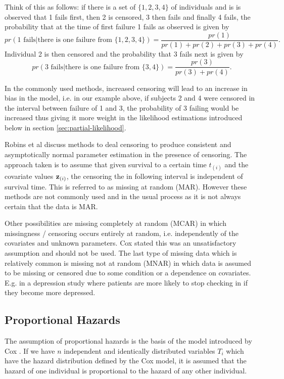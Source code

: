 Think of this as follows: if there is a set of $\{1,2,3,4\}$ of individuals and is is observed that 1 fails first, then 2 is censored, 3 then fails and finally 4 fails, the probability that at the time of first failure 1 fails as observed is given by $$pr(1\textrm{ fails}|\textrm{there is one failure from }\{1,2,3,4\})=\frac{pr(1)}{pr(1)+pr(2)+pr(3)+pr(4)}.$$ Individual 2 is then censored and the probability that 3 fails next is given by $$pr(3\textrm{ fails}|\textrm{there is one failure from }\{3,4\})=\frac{pr(3)}{pr(3)+pr(4)}.$$

In the commonly used methods, increased censoring will lead to an increase in bias in the model, i.e. in our example above, if subjects 2 and 4 were censored in the interval between failure of 1 and 3, the probability of 3 failing would be increased thus giving it more weight in the likelihood estimations introduced below in section \cref{sec:partial-likelihood}.

Robins et al  discuss methods to deal censoring to produce consistent and asymptotically normal parameter estimation in the presence of censoring. The approach taken is to assume that given survival to a certain time $t_{(i)}$ and the covariate values $\textbf{z}_{(i)}$, the censoring the in following interval is independent of survival time. This is referred to as  missing at random (MAR). However these methods are not commonly used and in the usual process as it is not always certain that the data is MAR.

Other possibilities are missing completely at random (MCAR) in which missingness / censoring occurs entirely at random, i.e. independently of the covariates and unknown parameters. Cox  stated this was an unsatisfactory assumption and should not be used. The last type of missing data which is relatively common is missing not at random (MNAR) in which data is assumed to be missing or censored due to some condition or a dependence on covariates. E.g. in a depression study where patients are more likely to stop checking in if they become more depressed.

\subsection{Proportional Hazards}

The assumption of proportional hazards is the basis of the model introduced by Cox . If we have $n$ independent and identically distributed variables $T_i$ which have the hazard distribution defined by the Cox model, it is assumed that the hazard of one individual is proportional to the hazard of any other individual.

